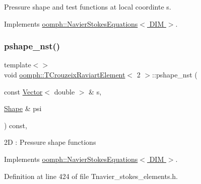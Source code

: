 Pressure shape and test functions at local coordinte s. 



Implements \hyperlink{classoomph_1_1NavierStokesEquations_a55f96a5c9f985476aeb145f683d63001}{oomph\+::\+Navier\+Stokes\+Equations$<$ D\+I\+M $>$}.

\mbox{\label{classoomph_1_1TCrouzeixRaviartElement_a70b147d8e7790e037d418b703ba4dc31}} 
\subsubsection{\texorpdfstring{pshape\+\_\+nst()}{pshape\_nst()}\hspace{0.1cm}{\footnotesize\ttfamily [3/6]}}
{\footnotesize\ttfamily template$<$$>$ \\
void \hyperlink{classoomph_1_1TCrouzeixRaviartElement}{oomph\+::\+T\+Crouzeix\+Raviart\+Element}$<$ 2 $>$\+::pshape\+\_\+nst (\begin{DoxyParamCaption}\item[{const \hyperlink{classoomph_1_1Vector}{Vector}$<$ double $>$ \&}]{s,  }\item[{\hyperlink{classoomph_1_1Shape}{Shape} \&}]{psi }\end{DoxyParamCaption}) const\hspace{0.3cm}{\ttfamily [inline]}, {\ttfamily [virtual]}}

2D \+: Pressure shape functions 

Implements \hyperlink{classoomph_1_1NavierStokesEquations_a487030303b71da299aed3d4639a022ab}{oomph\+::\+Navier\+Stokes\+Equations$<$ D\+I\+M $>$}.



Definition at line 424 of file Tnavier\+\_\+stokes\+\_\+elements.\+h.

\mbox{\label{classoomph_1_1TCrouzeixRaviartElement_aaf075113ef6d32642ec9d482a961ebdc}} 
